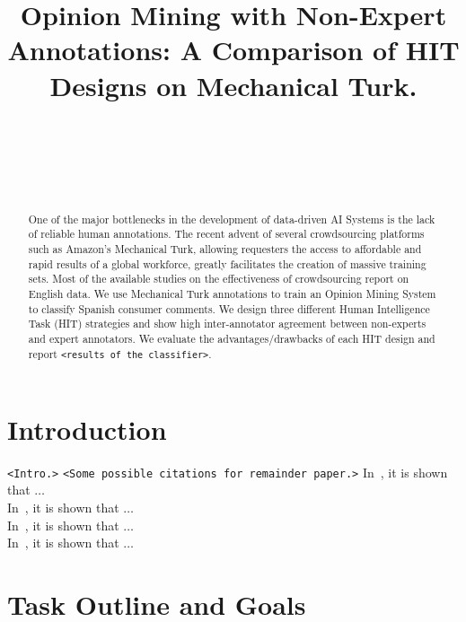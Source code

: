 \documentclass[11pt,letterpaper]{article}
\title{Opinion Mining with Non-Expert Annotations: A Comparison of HIT Designs on Mechanical Turk.}
\author{\\
  \\
  \\
  \\
  }
\date{}
\begin{document}
\maketitle
\begin{abstract}
  One of the major bottlenecks in the development of data-driven AI Systems is the lack of reliable human annotations. The recent advent of several crowdsourcing platforms such as Amazon's Mechanical Turk, allowing requesters the access to affordable and rapid results of a global workforce, greatly facilitates the creation of massive training sets. Most of the available studies on the effectiveness of crowdsourcing report on English data. We use Mechanical Turk annotations to train an Opinion Mining System to classify Spanish consumer comments. We design three different Human Intelligence Task (HIT) strategies and show high inter-annotator agreement between non-experts and expert annotators. We evaluate the advantages/drawbacks of each HIT design and report \texttt{<results of the classifier>}.
\end{abstract}

\section{Introduction}
\label{sect:intro}
\texttt{<Intro.>}
\texttt{<Some possible citations for remainder paper.>}
In~\cite{snow_cheap_2008}, it is shown that $\ldots$ \\
In~\cite{sheng_get_2008}, it is shown that $\ldots$ \\
In~\cite{kittur_crowdsourcing_2008}, it is shown that $\ldots$ \\
In~\cite{su_internet-scale_2007}, it is shown that $\ldots$ \\

\section{Task Outline and Goals}
\label{sect:outline}
\end{document}
